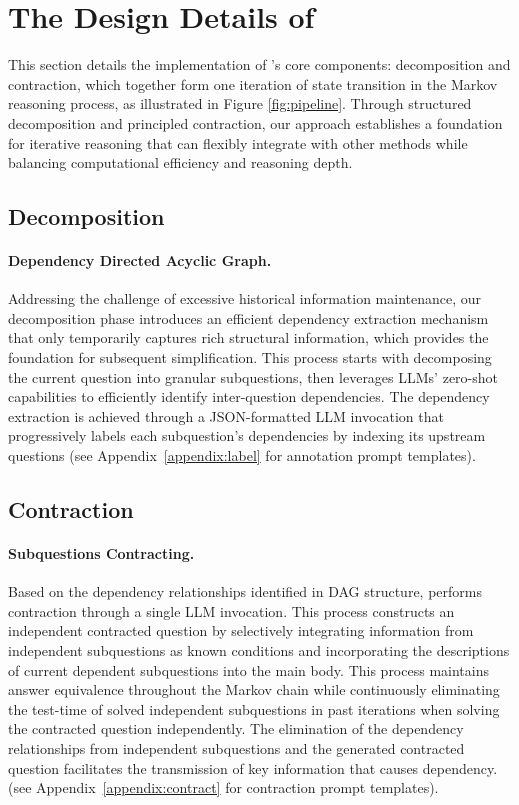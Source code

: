 \section{The Design Details of \our}
This section details the implementation of \our's core components: decomposition and contraction, which together form one iteration of state transition in the Markov reasoning process, as illustrated in Figure \ref{fig:pipeline}. Through structured decomposition and principled contraction, our approach establishes a foundation for iterative reasoning that can flexibly integrate with other methods while balancing computational efficiency and reasoning depth.

\subsection{Decomposition}

\paragraph{Dependency Directed Acyclic Graph.}
Addressing the challenge of excessive historical information maintenance, our decomposition phase introduces an efficient dependency extraction mechanism that only temporarily captures rich structural information, which provides the foundation for subsequent simplification. This process starts with decomposing the current question into granular subquestions, then leverages LLMs' zero-shot capabilities to efficiently identify inter-question dependencies. The dependency extraction is achieved through a JSON-formatted LLM invocation that progressively labels each subquestion's dependencies by indexing its upstream questions (see Appendix~\ref{appendix:label} for annotation prompt templates).

\subsection{Contraction}

\paragraph{Subquestions Contracting.}
Based on the dependency relationships identified in DAG structure, \our performs contraction through a single LLM invocation. This process constructs an independent contracted question by selectively integrating information from independent subquestions as known conditions and incorporating the descriptions of current dependent subquestions into the main body. This process maintains answer equivalence throughout the Markov chain while continuously eliminating the test-time of solved independent subquestions in past iterations when solving the contracted question independently. The elimination of the dependency relationships from independent subquestions and the generated contracted question facilitates the transmission of key information that causes dependency. (see Appendix~\ref{appendix:contract} for contraction prompt templates).

